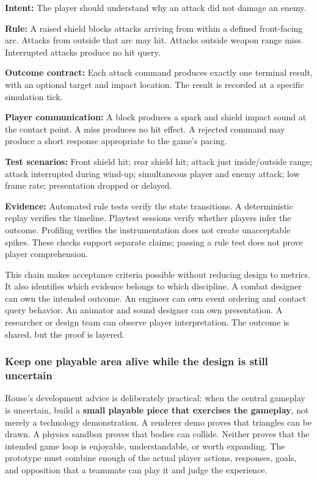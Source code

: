 \textbf{Intent:} The player should understand why an attack did not damage an enemy.

\textbf{Rule:} A raised shield blocks attacks arriving from within a defined front-facing arc. Attacks from outside that arc may hit. Attacks outside weapon range miss. Interrupted attacks produce no hit query.

\textbf{Outcome contract:} Each attack command produces exactly one terminal result, with an optional target and impact location. The result is recorded at a specific simulation tick.

\textbf{Player communication:} A block produces a spark and shield impact sound at the contact point. A miss produces no hit effect. A rejected command may produce a short response appropriate to the game's pacing.

\textbf{Test scenarios:} Front shield hit; rear shield hit; attack just inside/outside range; attack interrupted during wind-up; simultaneous player and enemy attack; low frame rate; presentation dropped or delayed.

\textbf{Evidence:} Automated rule tests verify the state transitions. A deterministic replay verifies the timeline. Playtest sessions verify whether players infer the outcome. Profiling verifies the instrumentation does not create unacceptable spikes. These checks support separate claims; passing a rule test does not prove player comprehension.

This chain makes acceptance criteria possible without reducing design to metrics. It also identifies which evidence belongs to which discipline. A combat designer can own the intended outcome. An engineer can own event ordering and contact query behavior. An animator and sound designer can own presentation. A researcher or design team can observe player interpretation. The outcome is shared, but the proof is layered.

\subsubsection{Keep one playable area alive while the design is still uncertain}\label{06-engine-ii-ch041-keep-one-playable-area-alive-while-the-design-is-still-uncertain}

\hypertarget{06-engine-ii-ch041-keep-one-playable-area-alive-while-the-design-is-still-uncertain}{}

Rouse's development advice is deliberately practical: when the central gameplay is uncertain, build a \textbf{small playable piece that exercises the gameplay}, not merely a technology demonstration. A renderer demo proves that triangles can be drawn. A physics sandbox proves that bodies can collide. Neither proves that the intended game loop is enjoyable, understandable, or worth expanding. The prototype must combine enough of the actual player actions, responses, goals, and opposition that a teammate can play it and judge the experience.

